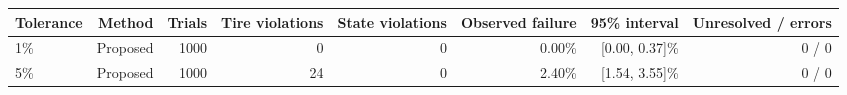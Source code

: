 \begin{tabular}{lrrrrrrr}
\toprule
Tolerance & Method & Trials & Tire violations & State violations & Observed failure & 95\% interval & Unresolved / errors \\
\midrule
1\% & Proposed & 1000 & 0 & 0 & 0.00\% & [0.00, 0.37]\% & 0 / 0 \\
5\% & Proposed & 1000 & 24 & 0 & 2.40\% & [1.54, 3.55]\% & 0 / 0 \\
\bottomrule
\end{tabular}
